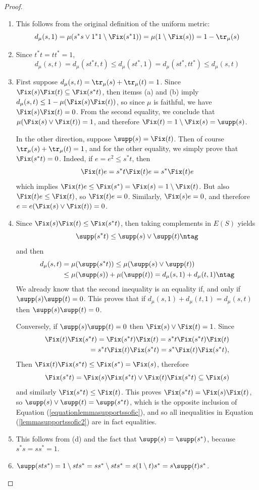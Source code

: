 \begin{proof}
\begin{enumerate}
\item[(a)] This follows from the original definition of the uniform metric:
\[d_\mu(s,1)=\mu(s^*s\lor 1^*1\setminus\Fix(s^*1))=\mu(1\setminus\Fix(s))=1-\tr_\mu(s)\]
\item[(b)] Since $t^*t=tt^*=1$,
\[d_\mu(s,t)=d_\mu(st^*t,t)\leq d_\mu(st^*,1)=d_\mu(st^*,tt^*)\leq d_\mu(s,t)\]
\item[(c)] First suppose $d_\mu(s,t)=\tr_\mu(s)+\tr_\mu(t)=1$. Since $\Fix(s)\Fix(t)\subseteq\Fix(s^*t)$, then itemss (a) and (b) imply $d_\mu(s,t)\leq 1-\mu(\Fix(s)\Fix(t))$, so since $\mu$ is faithful, we have $\Fix(s)\Fix(t)=0$. From the second equality, we conclude that $\mu(\Fix(s)\lor\Fix(t))=1$, and therefore $\Fix(t)=1\setminus\Fix(s)=\supp(s)$.

In the other direction, suppose $\supp(s)=\Fix(t)$. Then of course $\tr_\mu(s)+\tr_\mu(t)=1$, and for the other equality, we simply prove that $\Fix(s^*t)=0$. Indeed, if $e=e^2\leq s^*t$, then
\[\Fix(t)e=s^*t\Fix(t)e=s^*\Fix(t)e\]
which implies $\Fix(t)e\leq\Fix(s^*)=\Fix(s)=1\setminus\Fix(t)$. But also $\Fix(t)e\leq\Fix(t)$, so $\Fix(t)e=0$. Similarly, $\Fix(s)e=0$, and therefore $e=e(\Fix(s)\lor\Fix(t))=0$.
\item[(d)] Since $\Fix(s)\Fix(t)\leq\Fix(s^*t)$, then taking complements in $E(S)$ yields
\[\supp(s^*t)\leq\supp(s)\lor\supp(t)\ntag\label{equationlemmasupportssofic}\]
and then
\begin{align*}
d_\mu(s,t)&=\mu(\supp(s^*t))\leq\mu(\supp(s)\lor\supp(t))\\
&\leq \mu(\supp(s))+\mu(\supp(t))=d_\mu(s,1)+d_\mu(t,1)\ntag\label{lemmasupportssofic2}
\end{align*}
We already know that the second inequality is an equality if, and only if $\supp(s)\supp(t)=0$. This proves that if $d_\mu(s,1)+d_\mu(t,1)=d_\mu(s,t)$ then $\supp(s)\supp(t)=0$.

Conversely, if $\supp(s)\supp(t)=0$ then $\Fix(s)\lor\Fix(t)=1$. Since
\begin{align*}
\Fix(t)\Fix(s^*t)=\Fix(s^*t)\Fix(t)=s^*t\Fix(s^*t)\Fix(t)\\
=s^*t\Fix(t)\Fix(s^*t)=s^*\Fix(t)\Fix(s^*t),
\end{align*}
Then $\Fix(t)\Fix(s^*t)\leq\Fix(s^*)=\Fix(s)$, therefore
\[\Fix(s^*t)=\Fix(s)\Fix(s^*t)\lor\Fix(t)\Fix(s^*t)\subseteq\Fix(s)\]
and similarly $\Fix(s^*t)\leq\Fix(t)$. This proves $\Fix(s^*t)=\Fix(s)\Fix(t)$, so $\supp(s)\lor\supp(t)=\supp(s^*t)$, which is the opposite inclusion of Equation (\ref{equationlemmasupportssofic}), and so all inequalities in Equation (\ref{lemmasupportssofic2}) are in fact equalities.
\item[(e)] This follows from (d) and the fact that $\supp(s)=\supp(s^*)$, because $s^*s=ss^*=1$.
\item[(f)] $\supp(sts^*)=1\setminus sts^*=ss^*\setminus sts^*=s(1\setminus t)s^*=s\supp(t)s^*$.\qedhere
\end{enumerate}
\end{proof}

